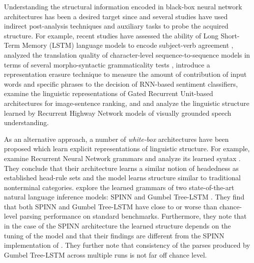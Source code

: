 Understanding the structural information encoded in black-box neural network 
architectures has been a desired target since \citet{elman1990finding} and several studies have 
used indirect post-analysis techniques and auxiliary tasks to probe the acquired 
structure. For example, recent studies have assessed the ability of Long Short-Term 
Memory (LSTM) language models to encode subject-verb agreement 
\citep{linzen2016assessing}, analyzed the translation quality of character-level 
sequence-to-sequence models in terms of several morpho-syntactic grammaticality 
tests \citep{sennrich2016grammatical}, \cite{li2016understanding} introduce a representation erasure technique to measure the amount of contribution of input words and specific phrases to the decision of RNN-based sentiment classifiers, \cite{kadar2017representation} examine the linguistic representations of Gated 
Recurrent Unit-based architectures for image-sentence ranking, 
and \cite{chrupala2017representations} and \cite{alishahi2017encoding} analyze the linguistic 
structure learned by Recurrent Highway Network models of visually grounded 
speech understanding. 

As an alternative approach, a number of {\em white-box} architectures have been 
proposed which learn explicit representations of linguistic structure. For 
example, \cite{dyer2016recurrent} examine Recurrent Neural Network grammars 
and analyze its learned syntax \citep{kuncoro2016recurrent}. They conclude that their architecture learns a similar notion of headedness as established head-rule sets and the model learns structure similar to traditional nonterminal categories.
\cite{williams2017learning} explore the learned grammars of two state-of-the-art natural language inference models: SPINN 
\citep{bowman2016fast} and Gumbel Tree-LSTM \citep{choi2017learning}. They find that both SPINN and Gumbel Tree-LSTM have close to or worse than chance-level parsing performance on standard benchmarks. Furthermore, they note that in the case of the SPINN architecture the learned structure depends on the tuning of the model and that their findings are different from the SPINN implementation of \cite{yogatama2016learning}. They further note that consistency of the parses produced by Gumbel Tree-LSTM across multiple runs is not far off chance level. 

